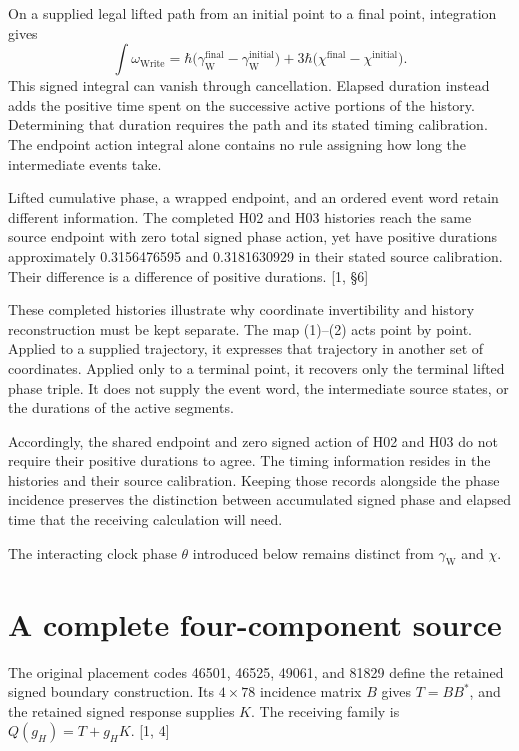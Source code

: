 \documentclass[10pt,twocolumn,letterpaper]{article}
\begin{document}
On a supplied legal lifted path from an initial point to a final point, integration gives
\[
\int\omega_{\mathrm{Write}}
=\hbar\bigl(\gamma_{\mathrm W}^{\mathrm{final}}
-\gamma_{\mathrm W}^{\mathrm{initial}}\bigr)
+3\hbar\bigl(\chi^{\mathrm{final}}-\chi^{\mathrm{initial}}\bigr).
\]
This signed integral can vanish through cancellation. Elapsed duration instead adds the positive time spent on the successive active portions of the history. Determining that duration requires the path and its stated timing calibration. The endpoint action integral alone contains no rule assigning how long the intermediate events take.



Lifted cumulative phase, a wrapped endpoint, and an ordered event word retain different information. The completed H02 and H03 histories reach the same source endpoint with zero total signed phase action, yet have positive durations approximately 0.3156476595 and 0.3181630929 in their stated source calibration. Their difference is a difference of positive durations. [1, \S6]

These completed histories illustrate why coordinate invertibility and history reconstruction must be kept separate. The map (1)--(2) acts point by point. Applied to a supplied trajectory, it expresses that trajectory in another set of coordinates. Applied only to a terminal point, it recovers only the terminal lifted phase triple. It does not supply the event word, the intermediate source states, or the durations of the active segments.

Accordingly, the shared endpoint and zero signed action of H02 and H03 do not require their positive durations to agree. The timing information resides in the histories and their source calibration. Keeping those records alongside the phase incidence preserves the distinction between accumulated signed phase and elapsed time that the receiving calculation will need.



The interacting clock phase $\theta$ introduced below remains distinct from $\gamma_{\mathrm{W}}$ and $\chi$.

\section{A complete four-component source}
The original placement codes 46501, 46525, 49061, and 81829 define the retained signed boundary construction. Its $4\times78$ incidence matrix $B$ gives $T=BB^*$, and the retained signed response supplies $K$. The receiving family is $Q(g_H)=T+g_HK$. [1, 4]
\end{document}
